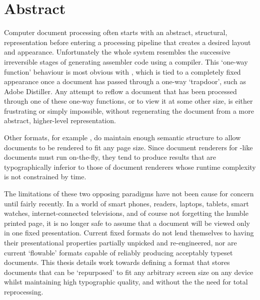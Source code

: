 \cleardoublepage
\begingroup
\let\clearpage\relax
\let\cleardoublepage\relax
\let\cleardoublepage\relax

\chapter*{Abstract}
Computer document processing often starts with an abstract, structural, representation before entering a processing pipeline that creates a desired layout and appearance. Unfortunately the whole system resembles the successive irreversible stages of generating assembler code using a compiler. This `one-way function' behaviour is most obvious with \pdf{}, which is tied to a completely fixed appearance once a document has passed through a one-way `trapdoor', such as Adobe Distiller. Any attempt to reflow a document that has been processed through one of these one-way functions, or to view it at some other size, is either frustrating or simply impossible, without regenerating the document from a more abstract, higher-level representation.

Other formats, for example \html{}, do maintain enough semantic structure to allow documents to be rendered to fit any page size. Since document renderers for \html{}-like documents must run on-the-fly, they tend to produce results that are typographically inferior to those of document renderers whose runtime complexity is not constrained by time.

The limitations of these two opposing paradigms have not been cause for concern until fairly recently. In a world of smart phones, \ebook{} readers, laptops, tablets, smart watches, internet-connected televisions, and of course not forgetting the humble printed page, it is no longer safe to assume that a document will be viewed only in one fixed presentation. Current fixed formats do not lend themselves to having their presentational properties partially unpicked and re-engineered, nor are current `flowable' formats capable of reliably producing acceptably typeset documents. This thesis details work towards defining a format that stores documents that can be `repurposed' to fit any arbitrary screen size on any device whilst maintaining high typographic quality, and without the the need for total reprocessing.

\endgroup

\vfill